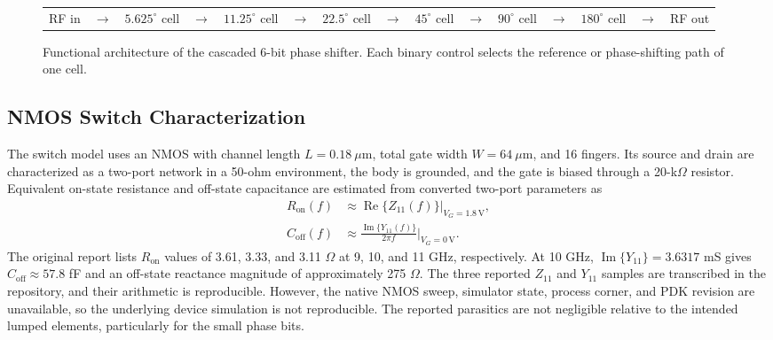 \documentclass[conference]{IEEEtran}
\begin{document}
\begin{figure}[!t]
\centering
\scriptsize
\setlength{\tabcolsep}{2.0pt}
\begin{tabular}{c c c c c c c c c c c c c c c}
RF in & $\rightarrow$ &
\fbox{\parbox[c][0.42in][c]{0.68in}{\centering $5.625^\circ$\\cell}} &
$\rightarrow$ &
\fbox{\parbox[c][0.42in][c]{0.68in}{\centering $11.25^\circ$\\cell}} &
$\rightarrow$ &
\fbox{\parbox[c][0.42in][c]{0.68in}{\centering $22.5^\circ$\\cell}} &
$\rightarrow$ &
\fbox{\parbox[c][0.42in][c]{0.68in}{\centering $45^\circ$\\cell}} &
$\rightarrow$ &
\fbox{\parbox[c][0.42in][c]{0.68in}{\centering $90^\circ$\\cell}} &
$\rightarrow$ &
\fbox{\parbox[c][0.42in][c]{0.68in}{\centering $180^\circ$\\cell}} &
$\rightarrow$ & RF out
\end{tabular}
\caption{Functional architecture of the cascaded 6-bit phase shifter. Each
binary control selects the reference or phase-shifting path of one cell.}
\label{fig:architecture}
\end{figure}

\subsection{NMOS Switch Characterization}

The switch model uses an NMOS with channel length $L=0.18~\mu\mathrm{m}$,
total gate width $W=64~\mu\mathrm{m}$, and 16 fingers. Its source and drain
are characterized as a two-port network in a 50-ohm environment, the body is
grounded, and the gate is biased through a 20-k$\Omega$ resistor. Equivalent
on-state resistance and off-state capacitance are estimated from converted
two-port parameters as
\begin{equation}
\begin{aligned}
 R_{\mathrm{on}}(f)
   &\approx \operatorname{Re}\{Z_{11}(f)\}\big|_{V_G=1.8\,\mathrm{V}},\\
 C_{\mathrm{off}}(f)
   &\approx
   \frac{\operatorname{Im}\{Y_{11}(f)\}}
        {2\pi f}\bigg|_{V_G=0\,\mathrm{V}} .
\end{aligned}
\label{eq:switch_parameters}
\end{equation}
The original report lists $R_{\mathrm{on}}$ values of 3.61, 3.33, and
3.11 $\Omega$ at 9, 10, and 11 GHz, respectively. At 10 GHz,
$\operatorname{Im}\{Y_{11}\}=3.6317$ mS gives
$C_{\mathrm{off}}\approx57.8$ fF and an off-state reactance magnitude of
approximately 275 $\Omega$. The three reported $Z_{11}$ and $Y_{11}$ samples
are transcribed in the repository, and their arithmetic is reproducible.
However, the native NMOS sweep, simulator state, process corner, and PDK
revision are unavailable, so the underlying device simulation is not
reproducible. The reported parasitics are not negligible relative to the
intended lumped elements, particularly for the small phase bits.
\end{document}

